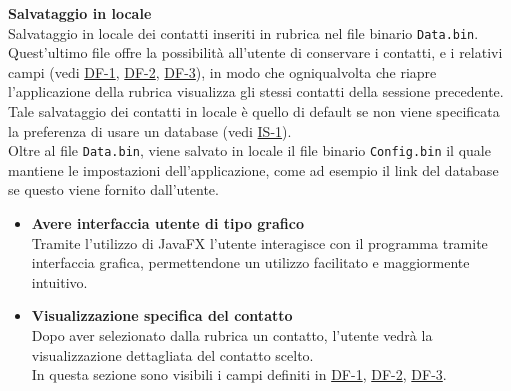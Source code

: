 \begin{tcolorbox}[colback=white,colframe=black!80!white,title=\textbf{Esigenze dei dati e informazioni DF}]
\begin{itemize}[itemsep=2pt, topsep=0pt]
		\hypertarget{DF-4}{\item[\textbf{DF-4}]} \textbf{Salvataggio in locale}
		\\Salvataggio in locale dei contatti inseriti in rubrica nel file binario \texttt{Data.bin}. Quest’ultimo file offre la possibilità all’utente di conservare i contatti, e i relativi campi (vedi \hyperlink{DF-1}{DF-1}, \hyperlink{DF-2}{DF-2}, \hyperlink{DF-3}{DF-3}), in modo che ogniqualvolta che riapre l’applicazione della rubrica visualizza gli stessi contatti della sessione precedente.
		\\Tale salvataggio dei contatti in locale è quello di default se non viene specificata la preferenza di usare un database (vedi \hyperlink{IS-1}{IS-1}).
		\\Oltre al file \texttt{Data.bin}, viene salvato in locale il file binario \texttt{Config.bin} il quale mantiene le impostazioni dell’applicazione, come ad esempio il link del database se questo viene fornito dall’utente.
		
	\end{itemize}
\end{tcolorbox}

\begin{tcolorbox}[colback=white,colframe=black!80!white,title=\textbf{Interfaccia Utente UI}]
	\begin{itemize}[itemsep=2pt, topsep=0pt]
		\item[\textbf{UI-1}] \textbf{Avere interfaccia utente di tipo grafico} 
		\\Tramite l’utilizzo di JavaFX l’utente interagisce con il programma tramite interfaccia grafica, permettendone un utilizzo facilitato e maggiormente intuitivo.
		
		\item[\textbf{UI-2}] \textbf{Visualizzazione specifica del contatto}
		\\Dopo aver selezionato dalla rubrica un contatto, l’utente vedrà la visualizzazione dettagliata del contatto scelto.
		\\In questa sezione sono visibili i campi definiti in \hyperlink{DF-1}{DF-1}, \hyperlink{DF-2}{DF-2}, \hyperlink{DF-3}{DF-3}.		
	\end{itemize}
\end{tcolorbox}

